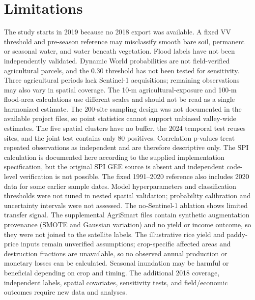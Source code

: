 \documentclass[pdflatex,sn-mathphys,Numbered]{sn-jnl}
\begin{document}
\section{Limitations}
The study starts in 2019 because no 2018 export was available. A fixed VV threshold and pre-season reference may misclassify smooth bare soil, permanent or seasonal water, and water beneath vegetation. Flood labels have not been independently validated. Dynamic World probabilities are not field-verified agricultural parcels, and the 0.30 threshold has not been tested for sensitivity. Three agricultural periods lack Sentinel-1 acquisitions; remaining observations may also vary in spatial coverage. The 10-m agricultural-exposure and 100-m flood-area calculations use different scales and should not be read as a single harmonized estimate. The 200-site sampling design was not documented in the available project files, so point statistics cannot support unbiased valley-wide estimates. The five spatial clusters have no buffer, the 2024 temporal test reuses sites, and the joint test contains only 80 positives. Correlation p-values treat repeated observations as independent and are therefore descriptive only. The SPI calculation is documented here according to the supplied implementation specification, but the original SPI GEE source is absent and independent code-level verification is not possible. The fixed 1991--2020 reference also includes 2020 data for some earlier sample dates. Model hyperparameters and classification thresholds were not tuned in nested spatial validation; probability calibration and uncertainty intervals were not assessed. The no-Sentinel-1 ablation shows limited transfer signal. The supplemental AgriSmart files contain synthetic augmentation provenance (SMOTE and Gaussian variation) and no yield or income outcome, so they were not joined to the satellite labels. The illustrative rice yield and paddy-price inputs remain unverified assumptions; crop-specific affected areas and destruction fractions are unavailable, so no observed annual production or monetary losses can be calculated. Seasonal inundation may be harmful or beneficial depending on crop and timing. The additional 2018 coverage, independent labels, spatial covariates, sensitivity tests, and field/economic outcomes require new data and analyses.
\end{document}
